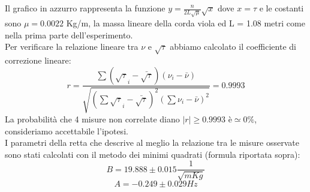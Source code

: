 \documentclass[a4paper]{article}
\theoremstyle{definition}
\begin{document}
\begin{figure}[!htbp]
\end{figure}

\noindent Il grafico in azzurro rappresenta la funzione \(y = \frac{n}{2L\sqrt{\mu}}\sqrt{x}\) dove \(x = \tau\) e le costanti sono \(\mu = 0.0022\) Kg/m, la massa lineare della corda viola ed L = 1.08 metri come nella prima parte dell'esperimento.\\
Per verificare la relazione lineare tra \(\nu\) e \(\sqrt{\tau}\) abbiamo calcolato il coefficiente di correzione lineare:
\[ r = \frac{\sum (\sqrt{\tau}_{i}-\bar{\sqrt{\tau}})(\nu_{i}-\bar{\nu})}{\sqrt{(\sum \sqrt{\tau}_{i}-\bar{\sqrt{\tau}})^{2}(\sum \nu_{i}-\bar{\nu})^{2}}} =  0.9993\]
\noindent La probabilità che 4 misure non correlate diano \(\left | r \right | \geq  0.9993\) è\(\simeq 0 \%\), consideriamo accettabile l'ipotesi.\\
I parametri della retta che descrive al meglio la relazione tra le misure osservate sono stati calcolati con il metodo dei minimi quadrati (formula riportata sopra):
\[B=19.888 \pm 0.015 \frac{1}{\sqrt{m Kg}}\]
\[A=-0.249\pm 0.029 Hz\]
\end{document}
